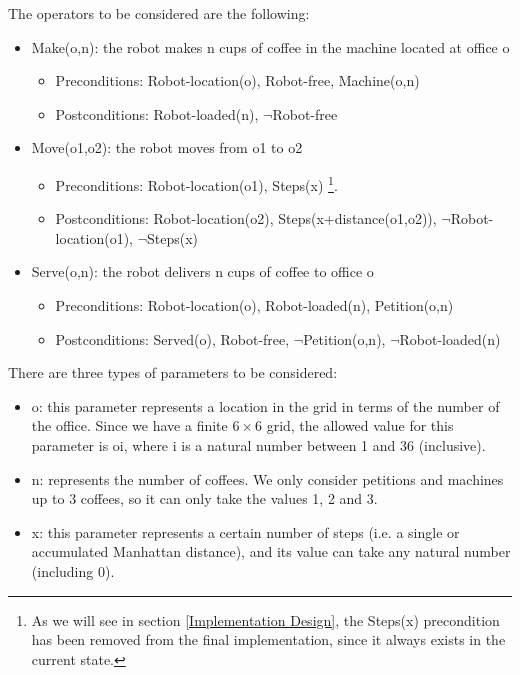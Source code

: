\documentclass[12pt,a4paper,oneside]{article}
\numberwithin{equation}{section}
\numberwithin{equation}{section}
\theoremstyle{definition}
\begin{document}
The operators to be considered are the following:
\begin{itemize}
	\item Make(o,n): the robot makes n cups of coffee in the machine located at office o
	\begin{itemize}
		\item Preconditions: Robot-location(o), Robot-free, Machine(o,n)
		\item Postconditions: Robot-loaded(n), $\neg$Robot-free
	\end{itemize}
	\item Move(o1,o2): the robot moves from o1 to o2
	\begin{itemize}
		\item Preconditions: Robot-location(o1), Steps(x) \footnote{As we will see in section \ref{Implementation Design}, the Steps(x) precondition has been removed from the final implementation, since it always exists in the current state.}.
		\item Postconditions: Robot-location(o2), Steps(x+distance(o1,o2)), $\neg$Robot-location(o1), $\neg$Steps(x)
	\end{itemize}
	\item Serve(o,n): the robot delivers n cups of coffee to office o
	\begin{itemize}
		\item Preconditions: Robot-location(o), Robot-loaded(n), Petition(o,n)
		\item Postconditions: Served(o), Robot-free, $\neg$Petition(o,n), $\neg$Robot-loaded(n)
	\end{itemize}
\end{itemize}

There are three types of parameters to be considered:
\begin{itemize}
	\item o: this parameter represents a location in the grid in terms of the number of the office. Since we have a finite $6 \times 6$ grid, the allowed value for this parameter is oi, where i is a natural number between 1 and 36 (inclusive).
	\item n: represents the number of coffees. We only consider petitions and machines up to 3 coffees, so it can only take the values 1, 2 and 3.
	\item x: this parameter represents a certain number of steps (i.e. a single or accumulated Manhattan distance), and its value can take any natural number (including 0). 
\end{itemize}
\end{document}
